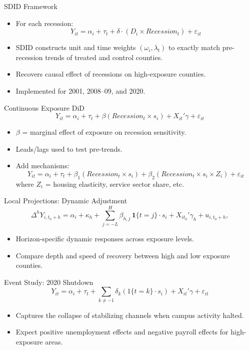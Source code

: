 \documentclass[10pt,compress]{beamer}
\begin{document}
\begin{frame}{SDID Framework}
	\begin{itemize}
		\item For each recession:
		\[
		Y_{it} = \alpha_i + \tau_t + \delta \cdot (D_i \times Recession_t) + \varepsilon_{it}
		\]
		\item SDID constructs unit and time weights $(\omega_i, \lambda_t)$ to exactly match pre-recession trends of treated and control counties.  
		\item Recovers causal effect of recessions on high-exposure counties.
		\item Implemented for 2001, 2008–09, and 2020.
	\end{itemize}
\end{frame}

\begin{frame}{Continuous Exposure DiD}
	\[
	Y_{it} = \alpha_i + \tau_t + \beta (Recession_t \times s_i) + X_{it}'\gamma + \varepsilon_{it}
	\]
	\begin{itemize}
		\item $\beta$ = marginal effect of exposure on recession sensitivity.
		\item Leads/lags used to test pre-trends.
		\item Add mechanisms:
		\[
		Y_{it} = \alpha_i + \tau_t + \beta_1 (Recession_t \times s_i) + \beta_2 (Recession_t \times s_i \times Z_i) + \varepsilon_{it}
		\]
		where $Z_i$ = housing elasticity, service sector share, etc.
	\end{itemize}
\end{frame}

\begin{frame}{Local Projections: Dynamic Adjustment}
	\begin{equation*}
		\Delta^h Y_{i,t_0+h} = \alpha_i + \kappa_h + \sum_{j=-L}^{H}\beta_{h,j}\,\mathbf{1}\{t=j\}\cdot s_i + X_{it_0}'\gamma_h + u_{i,t_0+h},
	\end{equation*}
	
	\begin{itemize}
		\item Horizon-specific dynamic responses across exposure levels.
		\item Compare depth and speed of recovery between high and low exposure counties.
	\end{itemize}
\end{frame}

\begin{frame}{Event Study: 2020 Shutdown}
	\[
	Y_{it} = \alpha_i + \tau_t + \sum_{k \neq -1} \delta_k (1\{t=k\} \cdot s_i) + X_{it}'\gamma + \varepsilon_{it}
	\]
	\begin{itemize}
		\item Captures the collapse of stabilizing channels when campus activity halted.
		\item Expect positive unemployment effects and negative payroll effects for high-exposure areas.
	\end{itemize}
\end{frame}
\end{document}
